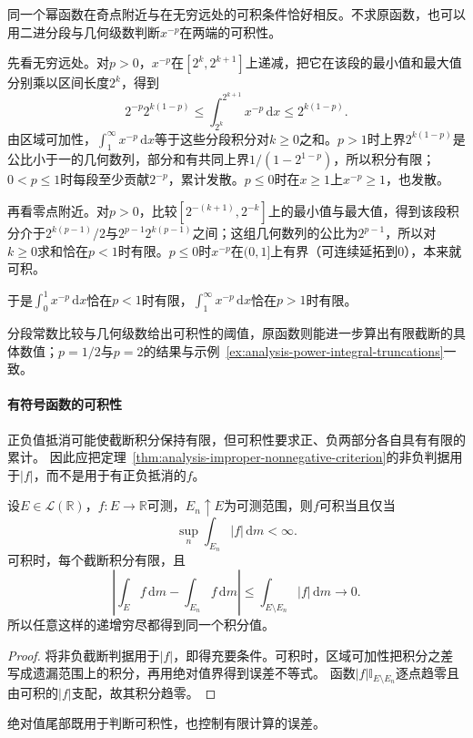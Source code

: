 同一个幂函数在奇点附近与在无穷远处的可积条件恰好相反。不求原函数，也可以用二进分段与几何级数判断$x^{-p}$在两端的可积性。
\begin{example}
\label{ex:analysis-power-integrability-thresholds}
先看无穷远处。对$p>0$，$x^{-p}$在$[2^k,2^{k+1}]$上递减，把它在该段的最小值和最大值分别乘以区间长度$2^k$，得到
\[
 2^{-p}2^{k(1-p)}\leq\int_{2^k}^{2^{k+1}}x^{-p}\,\mathrm dx\leq2^{k(1-p)}.
\]
由区域可加性，$\int_1^\infty x^{-p}\,\mathrm dx$等于这些分段积分对$k\geq0$之和。$p>1$时上界$2^{k(1-p)}$是公比小于一的几何数列，部分和有共同上界$1/(1-2^{1-p})$，所以积分有限；$0<p\leq1$时每段至少贡献$2^{-p}$，累计发散。$p\leq0$时在$x\geq1$上$x^{-p}\geq1$，也发散。

再看零点附近。对$p>0$，比较$[2^{-(k+1)},2^{-k}]$上的最小值与最大值，得到该段积分介于$2^{k(p-1)}/2$与$2^{p-1}2^{k(p-1)}$之间；这组几何数列的公比为$2^{p-1}$，所以对$k\geq0$求和恰在$p<1$时有限。$p\leq0$时$x^{-p}$在$(0,1]$上有界（可连续延拓到$0$），本来就可积。

于是$\int_0^1x^{-p}\,\mathrm dx$恰在$p<1$时有限，$\int_1^\infty x^{-p}\,\mathrm dx$恰在$p>1$时有限。
\end{example}
分段常数比较与几何级数给出可积性的阈值，原函数则能进一步算出有限截断的具体数值；$p=1/2$与$p=2$的结果与示例~\ref{ex:analysis-power-integral-truncations}一致。

\paragraph{有符号函数的可积性}
正负值抵消可能使截断积分保持有限，但可积性要求正、负两部分各自具有有限的累计。
因此应把定理~\ref{thm:analysis-improper-nonnegative-criterion}的非负判据用于$|f|$，而不是用于有正负抵消的$f$。
\begin{theorem}[绝对截断累计的可积性判据]
\label{thm:analysis-improper-signed-criterion}
设$E\in\mathcal L(\mathbb R)$，$f:E\to\mathbb R$可测，$E_n\uparrow E$为可测范围，则$f$可积当且仅当
\[
 \sup_n\int_{E_n}|f|\,\mathrm dm<\infty.
\]
可积时，每个截断积分有限，且
\[
 \left|\int_Ef\,\mathrm dm-\int_{E_n}f\,\mathrm dm\right|
 \leq\int_{E\setminus E_n}|f|\,\mathrm dm\longrightarrow0.
\]
所以任意这样的递增穷尽都得到同一个积分值。
\end{theorem}
\begin{proof}
将非负截断判据用于$|f|$，即得充要条件。可积时，区域可加性把积分之差写成遗漏范围上的积分，再用绝对值界得到误差不等式。
函数$|f|\mathbb I_{E\setminus E_n}$逐点趋零且由可积的$|f|$支配，故其积分趋零。
\end{proof}
绝对值尾部既用于判断可积性，也控制有限计算的误差。

